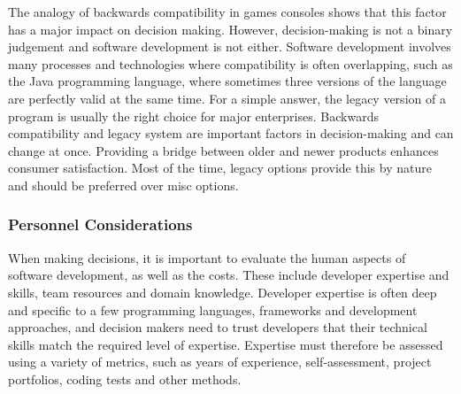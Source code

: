 \newline \noindent The analogy of backwards compatibility in games consoles shows that this factor has a major impact on decision making. However, decision-making is not a binary judgement and software development is not either. Software development involves many processes and technologies where compatibility is often overlapping, such as the Java programming language, where sometimes three versions of the language are perfectly valid at the same time. For a simple answer, the legacy version of a program is usually the right choice for major enterprises. 
\newline \noindent Backwards compatibility and legacy system are important factors in decision-making and can change at once. Providing a bridge between older and newer products enhances consumer satisfaction. Most of the time, legacy options provide this by nature and should be preferred over misc options. \cite{kramer_impact_2009}

\subsubsection{Personnel Considerations}
When making decisions, it is important to evaluate the human aspects of software development, as well as the costs. These include developer expertise and skills, team resources and domain knowledge. Developer expertise is often deep and specific to a few programming languages, frameworks and development approaches, and decision makers need to trust developers that their technical skills match the required level of expertise. Expertise must therefore be assessed using a variety of metrics, such as years of experience, self-assessment, project portfolios, coding tests and other methods. 


